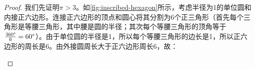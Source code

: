 \documentclass[b5paper]{ctexart}
\begin{document}
\begin{proof}
我们先证明$\pi > 3$。如\cref{fig:inscribed-hexagon}所示，考虑半径为1的单位圆和内接正六边形。连接正六边形的顶点和圆心将其分割为6个正三角形（首先每个三角形是等腰三角形，其中腰是圆的半径；其次每个等腰三角形的顶角等于$\frac{360\degree}{6} = 60\degree$）。由于单位圆的半径是1，所以每个等腰三角形的边长是1，所以正六边形的周长是6。由外接圆周长大于正六边形周长6，故：

\begin{figure}[htbp]
 \centering
\end{figure}


\end{proof}
\end{document}

